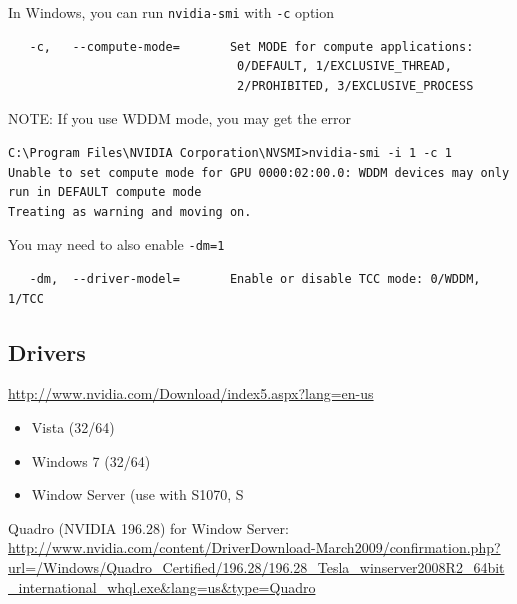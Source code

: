 In Windows, you can run \verb!nvidia-smi! with \verb!-c! option
\begin{verbatim}
   -c,   --compute-mode=       Set MODE for compute applications:
                                0/DEFAULT, 1/EXCLUSIVE_THREAD,
                                2/PROHIBITED, 3/EXCLUSIVE_PROCESS
\end{verbatim}

NOTE: If you use WDDM mode, you may get the error
\begin{verbatim}
C:\Program Files\NVIDIA Corporation\NVSMI>nvidia-smi -i 1 -c 1
Unable to set compute mode for GPU 0000:02:00.0: WDDM devices may only run in DEFAULT compute mode
Treating as warning and moving on.
\end{verbatim}
You may need to also enable \verb!-dm=1!
\begin{verbatim}
   -dm,  --driver-model=       Enable or disable TCC mode: 0/WDDM, 1/TCC
\end{verbatim}


\subsection{Drivers}
\label{sec:drivers}

\url{http://www.nvidia.com/Download/index5.aspx?lang=en-us}
\begin{itemize}
\item Vista (32/64)
\item Windows 7 (32/64)
\item Window Server (use with S1070, S
\end{itemize}

Quadro (NVIDIA 196.28) for Window Server: \url{http://www.nvidia.com/content/DriverDownload-March2009/confirmation.php?url=/Windows/Quadro_Certified/196.28/196.28_Tesla_winserver2008R2_64bit_international_whql.exe&lang=us&type=Quadro}

